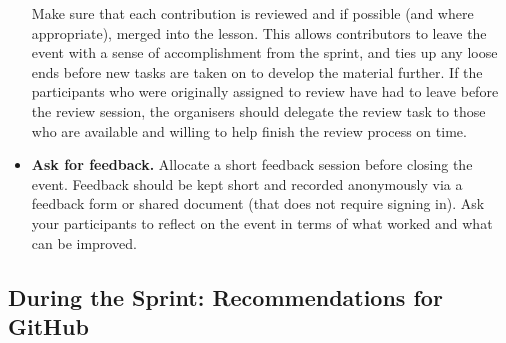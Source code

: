 \documentclass[
]{book}
\begin{document}
\begin{itemize}
  Make sure that each contribution is reviewed and if possible (and where appropriate), merged into the lesson.
  This allows contributors to leave the event with a sense of accomplishment from the sprint,
  and ties up any loose ends before new tasks are taken on to develop the material further.
  If the participants who were originally assigned to review have had to leave before the review session,
  the organisers should delegate the review task to those who are available and willing to help finish the review process on time.
\item
  \textbf{Ask for feedback.}
  Allocate a short feedback session before closing the event.
  Feedback should be kept short and recorded anonymously via a feedback form or shared document (that does not require signing in).
  Ask your participants to reflect on the event in terms of what worked and what can be improved.
\end{itemize}

\hypertarget{during-the-sprint-recommendations-for-github}{%
\subsection{During the Sprint: Recommendations for GitHub}\label{during-the-sprint-recommendations-for-github}}
\end{document}
